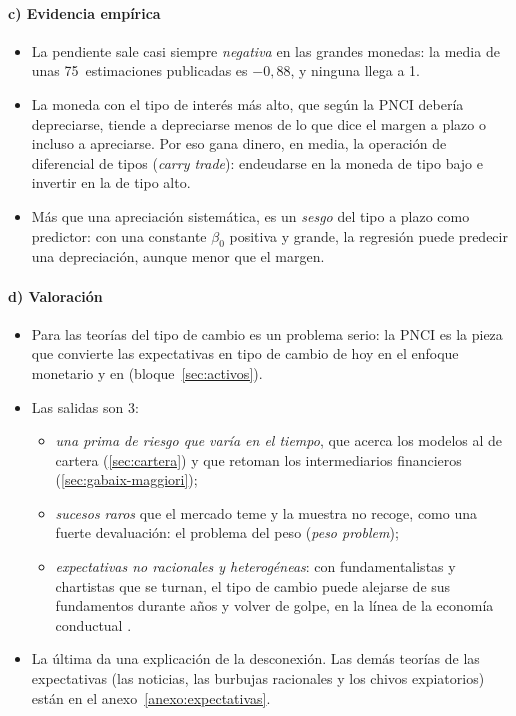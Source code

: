 \documentclass[11pt]{article}
\begin{document}
\paragraph{c) Evidencia empírica}
\begin{itemize}
\item La pendiente sale casi siempre \emph{negativa} en las grandes monedas: la media de unas 75~estimaciones publicadas es $-0{,}88$, y ninguna llega a 1\nocite{FrootThaler1990}.
\item La moneda con el tipo de interés más alto, que según la PNCI debería depreciarse, tiende a depreciarse menos de lo que dice el margen a plazo o incluso a apreciarse. Por eso gana dinero, en media, la operación de diferencial de tipos (\emph{carry trade}): endeudarse en la moneda de tipo bajo e invertir en la de tipo alto.
\item Más que una apreciación sistemática, es un \emph{sesgo} del tipo a plazo como predictor: con una constante $\beta_0$ positiva y grande, la regresión puede predecir una depreciación, aunque menor que el margen\nocite{Hodrick1987Empirical}.
\end{itemize}

\paragraph{d) Valoración}
\begin{itemize}
\item Para las teorías del tipo de cambio es un problema serio: la PNCI es la pieza que convierte las expectativas en tipo de cambio de hoy en el enfoque monetario y en  (bloque~\ref{sec:activos}).
\item Las salidas son 3:
  \begin{itemize}
  \item \emph{una prima de riesgo que varía en el tiempo}\nocite{Fama1984Forward}, que acerca los modelos al de cartera (\ref{sec:cartera}) y que retoman los intermediarios financieros (\ref{sec:gabaix-maggiori});
  \item \emph{sucesos raros} que el mercado teme y la muestra no recoge, como una fuerte devaluación: el problema del peso (\emph{peso problem});
  \item \emph{expectativas no racionales y heterogéneas}: con fundamentalistas y chartistas que se turnan, el tipo de cambio puede alejarse de sus fundamentos durante años y volver de golpe\nocite{FrankelFroot1990Chartists,DeGrauweGrimaldi2006}, en la línea de la economía conductual  .
  \end{itemize}
\item La última da una explicación de la desconexión. Las demás teorías de las expectativas (las noticias, las burbujas racionales y los chivos expiatorios) están en el anexo~\ref{anexo:expectativas}.
\end{itemize}
\end{document}

